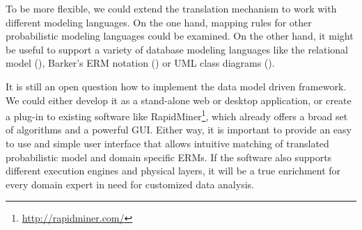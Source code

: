 To be more flexible, we could extend the translation mechanism to work with different modeling languages. On the one hand, mapping rules for other probabilistic modeling languages could be examined. On the other hand, it might be useful to support a variety of database modeling languages like the relational model (\cite{codd1970relational}), Barker's ERM notation (\cite{barker1990case}) or UML class diagrams (\cite{rumbaugh2004unified}).

It is still an open question how to implement the data model driven framework. We could either develop it as a stand-alone web or desktop application, or create a plug-in to existing software like RapidMiner\footnote{\url{http://rapidminer.com/}}, which already offers a broad set of algorithms and a powerful GUI. Either way, it is important to provide an easy to use and simple user interface that allows intuitive matching of translated probabilistic model and domain specific ERMs. If the software also supports different execution engines and physical layers, it will be a true enrichment for every domain expert in need for customized data analysis.
